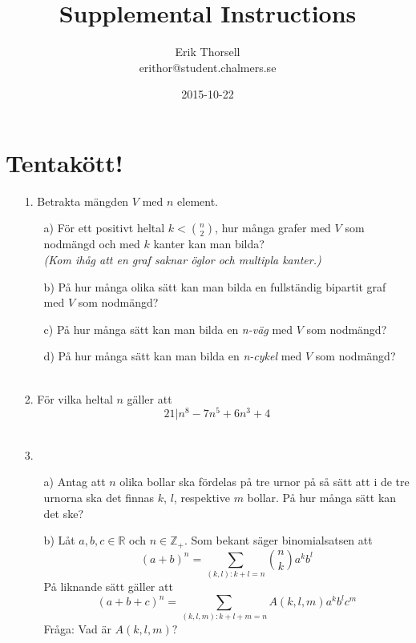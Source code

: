 \documentclass{article}
\title{Supplemental Instructions}
\author{Erik Thorsell \\ 
		\small{erithor@student.chalmers.se}
}
\date{2015-10-22}
\begin{document}
\maketitle

\section*{Tentakött!}

\begin{enumerate}

\item[1.]
Betrakta mängden $V$ med $n$ element.
\begin{itemize}
    \item[a)] För ett positivt heltal $k < \binom{n}{2}$, hur många grafer med 
              $V$ som nodmängd och med $k$ kanter kan man bilda?\\
              {\it (Kom ihåg att en graf saknar öglor och multipla kanter.)}
    \item[b)] På hur många olika sätt kan man bilda en fullständig bipartit 
              graf med $V$ som nodmängd?
    \item[c)] På hur många sätt kan man bilda en {\it n-väg} med $V$ som 
              nodmängd?
    \item[d)] På hur många sätt kan man bilda en {\it n-cykel} med $V$ som 
              nodmängd?\\\\
\end{itemize}

\item[2.]
    För vilka heltal $n$ gäller att $$21|n^8 - 7n^5 + 6n^3 + 4$$\\

\item[3.]
\begin{itemize}
    \item[a)] Antag att $n$ olika bollar ska fördelas på tre urnor på så sätt 
              att i de tre urnorna ska det finnas $k$, $l$, respektive $m$ 
              bollar. På hur många sätt kan det ske?
    \item[b)] Låt $a,b,c \in \mathbb{R}$ och $n \in \mathbb{Z}_{+}$. Som 
              bekant säger binomialsatsen att $$(a+b)^n = \sum_{(k,l):k+l=n} 
              \binom{n}{k}a^kb^l$$
              På liknande sätt gäller att $$(a+b+c)^n = \sum_{(k,l,m):k+l+m=n} 
              A(k,l,m)a^kb^lc^m$$
              Fråga: Vad är $A(k,l,m)?$\\\\
\end{itemize}


\end{enumerate}
\end{document}
